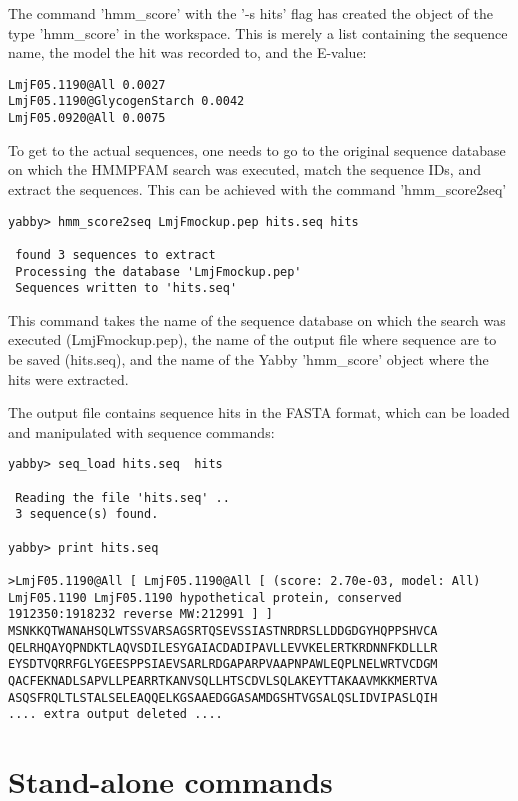 The command 'hmm\_score' with the '-s hits' flag has created
the object of the type 'hmm\_score' in the workspace. This is
merely a list containing the sequence name, the model the
hit was recorded to, and the E-value:

\begin{verbatim}
LmjF05.1190@All 0.0027
LmjF05.1190@GlycogenStarch 0.0042
LmjF05.0920@All 0.0075
\end{verbatim}

To get to the actual sequences, one needs to go to the
original sequence database on which the HMMPFAM search
was executed, match the sequence IDs, and extract the
sequences. This can be achieved with the command
'hmm\_score2seq'

\begin{verbatim}
yabby> hmm_score2seq LmjFmockup.pep hits.seq hits

 found 3 sequences to extract
 Processing the database 'LmjFmockup.pep'
 Sequences written to 'hits.seq'
\end{verbatim}

This command takes the name of the sequence database on
which the search was executed (LmjFmockup.pep), the name
of the output file where sequence are to be saved (hits.seq),
and the name of the Yabby 'hmm\_score' object where the
hits were extracted.

The output file contains sequence hits in the FASTA format,
which can be loaded and manipulated with sequence commands: 

\begin{verbatim}
yabby> seq_load hits.seq  hits

 Reading the file 'hits.seq' ..
 3 sequence(s) found.

yabby> print hits.seq

>LmjF05.1190@All [ LmjF05.1190@All [ (score: 2.70e-03, model: All) LmjF05.1190 LmjF05.1190 hypothetical protein, conserved 1912350:1918232 reverse MW:212991 ] ]
MSNKKQTWANAHSQLWTSSVARSAGSRTQSEVSSIASTNRDRSLLDDGDGYHQPPSHVCA
QELRHQAYQPNDKTLAQVSDILESYGAIACDADIPAVLLEVVKELERTKRDNNFKDLLLR
EYSDTVQRRFGLYGEESPPSIAEVSARLRDGAPARPVAAPNPAWLEQPLNELWRTVCDGM
QACFEKNADLSAPVLLPEARRTKANVSQLLHTSCDVLSQLAKEYTTAKAAVMKKMERTVA
ASQSFRQLTLSTALSELEAQQELKGSAAEDGGASAMDGSHTVGSALQSLIDVIPASLQIH
.... extra output deleted ....
\end{verbatim}

\section{Stand-alone commands}

